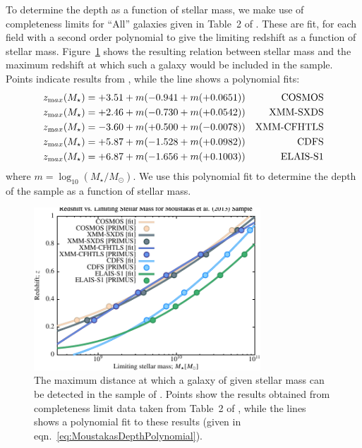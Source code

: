 To determine the depth as a function of stellar mass, we make use of completeness limits for ``All'' galaxies given in Table~2 of \cite{moustakas_primus:_2013}. These are fit, for each field with a second order polynomial to give the limiting redshift as a function of stellar mass. Figure~\ref{fig:MoustakasPRIMUSDepthFit} shows the resulting relation between stellar mass and the maximum redshift at which such a galaxy would be included in the sample. Points indicate results from \cite{moustakas_primus:_2013}, while the line shows a polynomial fits:
\begin{eqnarray}
z_{\mathrm max}(M_\star) = +3.51+m(-0.941+m(+0.0651)) & & \hbox{COSMOS} \\
z_{\mathrm max}(M_\star) = +2.46+m(-0.730+m(+0.0542)) & & \hbox{XMM-SXDS} \\
z_{\mathrm max}(M_\star) = -3.60+m(+0.500+m(-0.0078)) & & \hbox{XMM-CFHTLS} \\
z_{\mathrm max}(M_\star) = +5.87+m(-1.528+m(+0.0982)) & & \hbox{CDFS} \\
z_{\mathrm max}(M_\star) = +6.87+m(-1.656+m(+0.1003)) & & \hbox{ELAIS-S1}
 \label{eq:MoustakasDepthPolynomial}
\end{eqnarray}
where $m= \log_{10}(M_\star/M_\odot)$. We use this polynomial fit to determine the depth of the sample as a function of stellar mass.

\begin{figure}
 \begin{center}
 \includegraphics[width=85mm,trim=0mm 0mm 0mm 4mm,clip]{Plots/DataAnalysis/MoustakasPRIMUSMassRedshiftRelation.pdf}
 \end{center}
 \caption{The maximum distance at which a galaxy of given stellar mass can be detected in the sample of \protect\cite{moustakas_primus:_2013}. Points show the results obtained from completeness limit data taken from Table~2 of \protect\cite{moustakas_primus:_2013}, while the lines shows a polynomial fit to these results (given in eqn.~\ref{eq:MoustakasDepthPolynomial}).}
 \label{fig:MoustakasPRIMUSDepthFit}
\end{figure}

